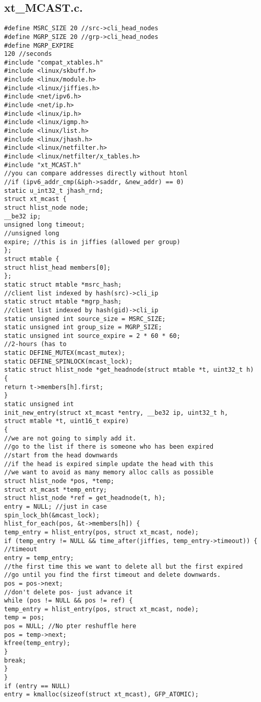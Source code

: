 \subsection{xt\_MCAST.c.}
\begin{verbatim}
#define MSRC_SIZE 20 //src->cli_head_nodes
#define MGRP_SIZE 20 //grp->cli_head_nodes
#define MGRP_EXPIRE
120 //seconds
#include "compat_xtables.h"
#include <linux/skbuff.h>
#include <linux/module.h>
#include <linux/jiffies.h>
#include <net/ipv6.h>
#include <net/ip.h>
#include <linux/ip.h>
#include <linux/igmp.h>
#include <linux/list.h>
#include <linux/jhash.h>
#include <linux/netfilter.h>
#include <linux/netfilter/x_tables.h>
#include "xt_MCAST.h"
//you can compare addresses directly without htonl
//if (ipv6_addr_cmp(&iph->saddr, &new_addr) == 0)
static u_int32_t jhash_rnd;
struct xt_mcast {
struct hlist_node node;
__be32 ip;
unsigned long timeout;
//unsigned long
expire; //this is in jiffies (allowed per group)
};
struct mtable {
struct hlist_head members[0];
};
static struct mtable *msrc_hash;
//client list indexed by hash(src)->cli_ip
static struct mtable *mgrp_hash;
//client list indexed by hash(gid)->cli_ip
static unsigned int source_size = MSRC_SIZE;
static unsigned int group_size = MGRP_SIZE;
static unsigned int source_expire = 2 * 60 * 60;
//2-hours (has to
static DEFINE_MUTEX(mcast_mutex);
static DEFINE_SPINLOCK(mcast_lock);
static struct hlist_node *get_headnode(struct mtable *t, uint32_t h)
{
return t->members[h].first;
}
static unsigned int
init_new_entry(struct xt_mcast *entry, __be32 ip, uint32_t h,
struct mtable *t, uint16_t expire)
{
//we are not going to simply add it.
//go to the list if there is someone who has been expired
//start from the head downwards
//if the head is expired simple update the head with this
//we want to avoid as many memory alloc calls as possible
struct hlist_node *pos, *temp;
struct xt_mcast *temp_entry;
struct hlist_node *ref = get_headnode(t, h);
entry = NULL; //just in case
spin_lock_bh(&mcast_lock);
hlist_for_each(pos, &t->members[h]) {
temp_entry = hlist_entry(pos, struct xt_mcast, node);
if (temp_entry != NULL && time_after(jiffies, temp_entry->timeout)) {
//timeout
entry = temp_entry;
//the first time this we want to delete all but the first expired
//go until you find the first timeout and delete downwards.
pos = pos->next;
//don't delete pos- just advance it
while (pos != NULL && pos != ref) {
temp_entry = hlist_entry(pos, struct xt_mcast, node);
temp = pos;
pos = NULL; //No pter reshuffle here
pos = temp->next;
kfree(temp_entry);
}
break;
}
}
if (entry == NULL)
entry = kmalloc(sizeof(struct xt_mcast), GFP_ATOMIC);

\end{verbatim}
